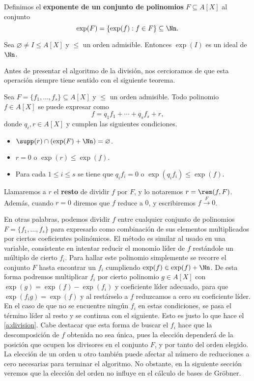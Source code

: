 \begin{definicion}
    Definimos el \textbf{exponente de un conjunto de polinomios} $F\subseteq A[X]$ al conjunto
    $$\exp(F) = \{\exp(f) : f\in F\} \subseteq \Nn.$$
\end{definicion}
\begin{proposicion}
    Sea $\varnothing \neq I \le A[X]$ y $\le$ un orden admisible. Entonces $\exp(I)$ es un ideal de $\Nn$.
\end{proposicion}
Antes de presentar el algoritmo de la división, nos cercioramos de que esta operación siempre tiene sentido con el siguiente teorema.
\begin{teorema}\label{t:division}
    Sea $F=\{f_1,\dots, f_s\} \subseteq A[X]$ y $\le$ un orden admisible. Todo polinomio $f\in A[X]$ se puede expresar como
    \begin{equation*}
        f = q_1f_1 + \cdots + q_sf_s + r,
    \end{equation*}
    donde $q_i, r\in A[X]$ y cumplen las siguientes condiciones.
    \begin{itemize}
        \item $\supp(r)\cap \left( \exp(F) + \Nn \right) = \varnothing$.
        \item $r=0$ o $\exp(r)\le \exp(f)$.
        \item Para cada $1\le i \le s$ se tiene que $q_if_i=0$ o $\exp(q_if_i)\le \exp(f)$.
    \end{itemize}
    Llamaremos a $r$ el \textbf{resto} de dividir $f$ por $F$, y lo notaremos $r = \rem(f, F)$. Además, cuando $r=0$ diremos que $f$ reduce a $0$, y escribiremos $f \stackrel{F}{\to} 0$.
\end{teorema}

En otras palabras, podemos dividir $f$ entre cualquier conjunto de polinomios $F=\{f_1, \dots, f_s\}$ para expresarlo como combinación de sus elementos multiplicados por ciertos coeficientes polinómicos. El método es similar al usado en una variable, consistente en intentar reducir el monomio líder de $f$ restándole un múltiplo de cierto $f_i$. Para hallar este polinomio simplemente se recorre el conjunto $F$ hasta encontrar un $f_i$ cumpliendo $\exp(f) \in \exp(f) + \Nn$. De esta forma podremos multiplicar $f_i$ por cierto polinomio $g\in A[X]$ con $\exp(g) = \exp(f)-\exp(f_i)$ y coeficiente líder adecuado, para que $\exp(f_ig) = \exp(f)$ y al restárselo a $f$ reduzcamos a cero su coeficiente líder. En el caso de que no se encuentre ningún $f_i$ en estas condiciones, se pasa el término líder al resto y se continua con el siguiente. Esto es justo lo que hace el \autoref{a:division}. Cabe destacar que esta forma de buscar el $f_i$ hace que la descomposición de $f$ obtenida no sea única, pues la elección dependerá de la posición que ocupen los divisores en el conjunto $F$, y por tanto del orden elegido. La elección de un orden u otro también puede afectar al número de reducciones a cero necesarias para terminar el algoritmo. No obstante, en la siguiente sección veremos que la elección del orden no influye en el cálculo de bases de Gröbner.

